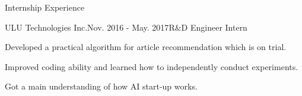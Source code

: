 \documentclass{resume} %
\begin{document}
\begin{comment}
\begin{rSubsection}{Large-Scale WEB Vulnerability Detection by Supervised Learning}{Oct. 2014 - June. 2015}{}{}
\item Developed an algorithm to detect malicious URLs from Shanghai Telecomm 120 gigabytes web log.
\item Extracted information including Whois, IP connection and URLs to form feature vectors.
\item Trained multiclass-SVM to classify benign or malicious URLs based on labels obtained from Google Safe Browsing API and achieved 86\% accuracy.
\end{rSubsection}

\begin{rSubsection}{Vehicle WLAN Based Car Sharing Platform}{Mar. 2014 - Dec. 2014}{}{}
\item Designed a car sharing system in 3-person team with vehicle based hardware, Android APP and web platform to improve efficiency of car rental service. 
\item Enrolled in Fourth Shanghai College Innovation \& Entrepreneurship Forum (3/300 selected from SJTU).
\item Patented in China : CN104836860 A
\end{rSubsection}

\end{rSection}
\vspace{0.5em}
\end{comment}
\begin{rSection}{Internship Experience}
\begin{rSubsection}{ULU Technologies Inc.}{Nov. 2016 - May. 2017}{R$\&$D  Engineer Intern}{}
\item Developed a practical algorithm for article recommendation which is on trial.
\item Improved coding ability and learned how to independently conduct experiments.
\item Got a main understanding of how AI start-up works.
\end{rSubsection}
\end{rSection}
\end{document}
